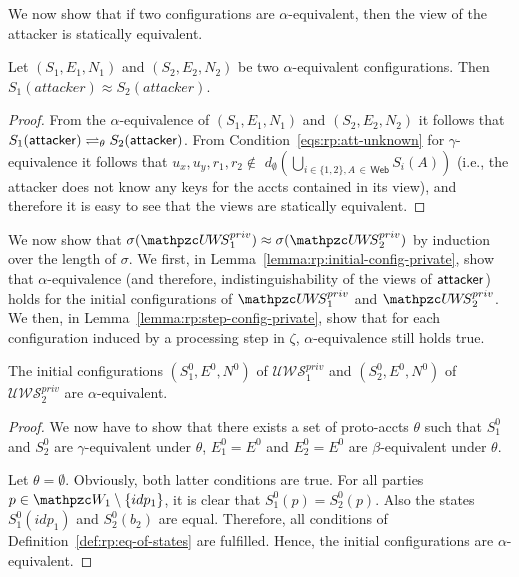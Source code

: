   We now show that if two configurations are $\alpha$-equivalent, 
  then the view of the attacker is statically equivalent.
  
  \begin{lemma}
    Let $(S_1,E_1,N_1)$ and $(S_2,E_2,N_2)$ be two 
    $\alpha$-equivalent configurations. 
    Then $S_1(attacker)\approx S_2(attacker)$.
  \end{lemma}
  \begin{proof}
    From the $\alpha$-equivalence of $(S_1,E_1,N_1)$ and 
    $(S_2,E_2,N_2)$ it follows that $S_1(\mathsf{attacker}) 
    \rightleftharpoons_{\theta} S_2(\mathsf{attacker})$.
    From Condition~\ref{eqs:rp:att-unknown} for 
    $\gamma$-equivalence it follows that
    $u_x, u_y, r_1, r_2 \not\in $
    $d_\emptyset(\bigcup_{i\in\{1,2\},A\,\in\,\mathsf{Web}}S_i(A))$ 
    (i.e., the attacker does not know any keys for the accts 
    contained in its view), and therefore it is easy to see 
    that the views are statically equivalent.
  \end{proof}
  
  We now show that $\sigma(\uppressoprivwebsystem_1) \approx
  \sigma(\uppressoprivwebsystem_2)$ by induction over the length 
  of $\sigma$. 
  We first, in Lemma~\ref{lemma:rp:initial-config-private}, 
  show that $\alpha$-equivalence (and therefore, 
  indistinguishability of the views of $\mathsf{attacker}$) holds 
  for the initial configurations of $\uppressoprivwebsystem_1$ 
  and $\uppressoprivwebsystem_2$. 
  We then, in Lemma~\ref{lemma:rp:step-config-private}, 
  show that for each configuration induced by a processing step 
  in $\zeta$, $\alpha$-equivalence still holds true.
  
  \begin{lemma}\label{lemma:rp:initial-config-private}
    The initial configurations $(S_1^0,E^0,N^0)$ of 
    $\mathcal{U\!W\!S}^{priv}_1$ and $(S_2^0,E^0,N^0)$ of 
    $\mathcal{U\!W\!S}^{priv}_2$ are $\alpha$-equivalent.
  \end{lemma}
  \begin{proof}
    We now have to show that there exists a set of proto-accts 
    $\theta$ such that $S_1^0$ and $S_2^0$ are 
    $\gamma$-equivalent under $\theta$, $E_1^0 = E^0$ and 
    $E_2^0 = E^0$ are $\beta$-equivalent under $\theta$.
  
    Let $\theta = \emptyset$. Obviously, both latter conditions 
    are true. For all parties $p \in \bidsystem_1 \setminus \{idp_1\}$, 
    it is clear that $S_1^0(p) = S_2^0(p)$. Also the states 
    $S_1^0(idp_1)$ and $S_2^0(b_2)$ are equal. Therefore, 
    all conditions of Definition~\ref{def:rp:eq-of-states} are 
    fulfilled. Hence, the initial configurations are 
    $\alpha$-equivalent.
  \end{proof}
  
